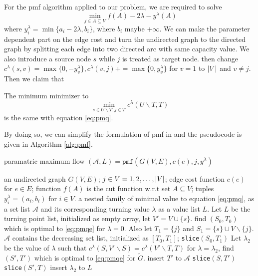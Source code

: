 \documentclass{article}
\begin{document}
For the pmf algorithm applied to our problem, we are required to solve 
\begin{equation}\label{eq:pmq}
\min_{j \in A \subseteq V} f(A) - 2\lambda - y^{\lambda}(A)
\end{equation}
where
$y^{\lambda}_i = \min\{a_i - 2\lambda, b_i\}$, where $b_i$ maybe $+\infty$. We can make the parameter dependent part on the edge cost and turn the undirected graph to the directed graph by splitting each edge into two directed arc with same capacity value. We also introduce a source
node $s$ while $j$ is treated as target node.  then change
$c^{\lambda}(s,v)=\max\{0, -y^{\lambda}_v\}, c^{\lambda}(v,j) += \max\{0, y^{\lambda}_v\}$ for $ v=1 $ to $\lvert V\rvert$ and $v \neq  j$. Then we claim that
\begin{proposition}
The minimum minimizer to 
\begin{equation}\label{eq:pmqe}
\min_{s\in U\backslash T, j\in T}c^{\lambda}(U\backslash T, T)
\end{equation}
is the same with equation \eqref{eq:pmq}.
\end{proposition}
By doing so, we can simplify the formulation of pmf in \cite{RN17} and the pseudocode is given in Algorithm \ref{alg:pmf}.
\begin{algorithm}
\caption{paramatric maximum flow $(\mathcal{A}, L) = \texttt{pmf}(G(V,E), c(e), j, y^{\lambda})$}\label{alg:pmf}
\begin{algorithmic}[1]
\REQUIRE an undirected graph $G(V, E)$; $j \in V={1,2,\dots, \lvert V\rvert}$; edge cost function $c(e)$ for $e \in E$; function $f(A)$ is the cut function w.r.t set $A\subseteq V$; tuples $y^{\lambda}_i = (a_i, b_i)$ for $i \in V$.
\ENSURE a nested family of minimal value to equation \eqref{eq:pmq}, as a set list $\mathcal{A}$ and its corresponding turning value $\lambda$ as a value list $L$.
\STATE Let $L$ be the turning point list, initialized as empty array, let $V'=V\cup\{s\}$.
\STATE find $(S_0, T_0)$ which is optimal to \eqref{eq:pmqe} for $ \lambda  = 0$.  Also let $T_1 = \{j\}$ and $S_1 = \{s\}\cup V \backslash \{j\}$.
\STATE $\mathcal{A}$ contains the decreasing set list, initialized as $[T_0, T_1]$;
\STATE \texttt{slice}$( S_0, T_1)$
  \STATE Let $\lambda_2$ be the value of $\lambda$ such that $c^{\lambda}(S, V'\backslash S) = 
c^{\lambda}(V'\backslash T, T)$ \label{findLambda}
\STATE for $\lambda = \lambda_2$, find $(S', T')$ which is optimal to \eqref{eq:pmqe} for $\widetilde{G}$.
\STATE insert $T'$ to $\mathcal{A}$
\STATE \texttt{slice}$(S, T')$
\STATE \texttt{slice}$(S', T)$
\ELSE
\STATE insert $\lambda_2$ to $L$ 
\ENDIF
\ENDFUNCTION
\end{algorithmic}
\end{algorithm}
\end{document}
